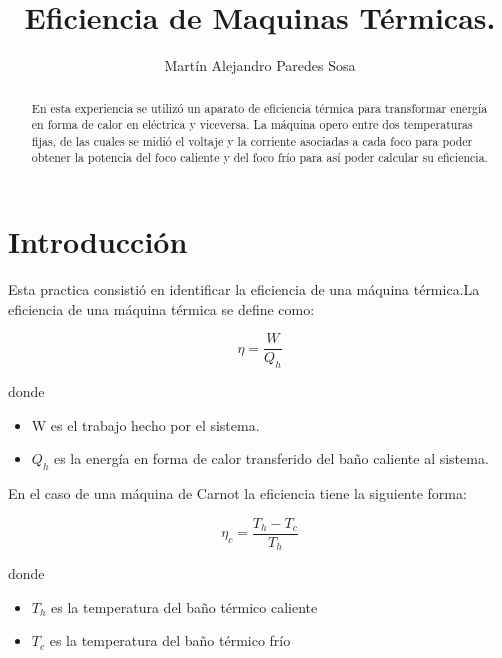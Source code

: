 \documentclass[12pt]{article}
\title{Eficiencia de Maquinas Térmicas.}
\author{Martín Alejandro Paredes Sosa}
\makeatletter
\let\thetitle\@title
\let\theauthor\@author
\makeatother
\begin{document}
\begin{center}
{ \large \bfseries \thetitle}
\end{center}
	\begin{minipage}{\textwidth}
		\begin{center} 
			\theauthor 
			\end{center}
	\end{minipage}
\begin{abstract}
En esta experiencia se utilizó un aparato de eficiencia térmica para transformar energía en forma de calor en eléctrica y viceversa. La máquina opero entre dos temperaturas fijas, de las cuales se midió el voltaje y la corriente asociadas a cada foco para poder obtener la potencia del foco caliente y del foco frío para así poder calcular su eficiencia.
\end{abstract}
\vspace{-1cm}
\section{Introducción}
Esta practica consistió en identificar la eficiencia de una máquina térmica.La eficiencia de una máquina térmica se define como:

\begin{equation}
\eta = \frac{W}{Q_h}
\end{equation}

donde
\begin{itemize}
 \item W es el trabajo hecho por el sistema.
\item $Q_h$ es la energía en forma de calor transferido del baño caliente al sistema.
\end{itemize}

En el caso de una máquina de Carnot la eficiencia tiene la siguiente forma:

\begin{equation}
\eta_c = \frac{T_h - T_c}{T_h}
\end{equation}

donde 
\begin{itemize}
\item $T_h$ es la temperatura del baño térmico caliente
\item $T_c$ es la temperatura del baño térmico frío
\end{itemize}
\end{document}
